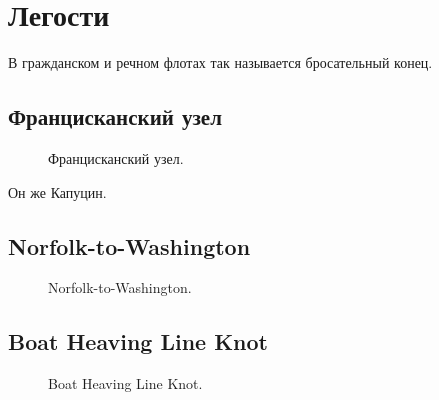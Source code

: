 \section{Легости}

В гражданском и речном флотах так называется бросательный конец.

\subsection{Францисканский узел}

\begin{figure}[H]\centering
	\begin{minipage}{1\linewidth}
		\begin{center}
			\tcbox[enhanced jigsaw,colframe=black,opacityframe=0.5,opacityback=0.5]
			{\centering{}}
		\end{center}
	\end{minipage}
\caption{Францисканский узел.}
	\label{ris:Francisk}
\end{figure}

Он же Капуцин.

\subsection{Norfolk-to-Washington}

\begin{figure}[H]\centering
	\begin{minipage}{1\linewidth}
		\begin{center}
			\tcbox[enhanced jigsaw,colframe=black,opacityframe=0.5,opacityback=0.5]
			{\centering{}}
		\end{center}
	\end{minipage}
\caption{Norfolk-to-Washington.}
	\label{ris:Norfolk-to-Washington}
\end{figure}

\subsection{Boat Heaving Line Knot}

\begin{figure}[H]\centering
	\begin{minipage}{1\linewidth}
		\begin{center}
			\tcbox[enhanced jigsaw,colframe=black,opacityframe=0.5,opacityback=0.5]
			{\centering{}}
		\end{center}
	\end{minipage}
\caption{Boat Heaving Line Knot.}
	\label{ris:Heaving_Line_Knot}
\end{figure}

